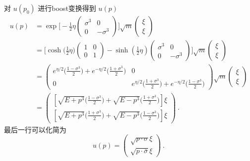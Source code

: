 \begin{exercise}{对 $u(p_0)$ 进行boost变换得到 $u(p)$}
\begin{equation}
\begin{aligned}\nonumber
u(p) & = \exp \bigg[ - \frac{1}{2} \eta \begin{pmatrix}
\sigma^3 & 0 \\ 
0 & - \sigma^3
\end{pmatrix} \bigg] \sqrt{m} \begin{pmatrix}
\xi \\ \xi
\end{pmatrix} \\ \nonumber
& = \bigg[ \cosh\big(\frac{1}{2}\eta\big)\begin{pmatrix}
1 & 0 \\
0 & 1
\end{pmatrix} - \sinh (\frac{1}{2}\eta) \begin{pmatrix}
\sigma^3 & 0 \\ \nonumber
0 & - \sigma^3
\end{pmatrix} \bigg]\sqrt{m} \begin{pmatrix}
\xi \\ \xi
\end{pmatrix} \\ \nonumber
& = \begin{pmatrix}
e^{\eta/2}\bigg(\frac{1-\sigma^3}{2}\bigg)+e^{-\eta/2}\bigg(\frac{1+\sigma^3}{2}\bigg) & 0\\
0 & e^{\eta/2}\bigg(\frac{1+\sigma^3}{2}\bigg)+e^{-\eta/2}\bigg(\frac{1-\sigma^3}{2}\bigg)
\end{pmatrix}\sqrt{m}\begin{pmatrix}
\xi \\ 
\xi
\end{pmatrix} \\\nonumber
& = \begin{pmatrix}
[\sqrt{E+p^3}\bigg(\frac{1-\sigma^3}{2}\bigg)+\sqrt{E-p^3}\bigg(\frac{1+\sigma^3}{2}\bigg)]\xi \\
[\sqrt{E+p^3}\bigg(\frac{1+\sigma^3}{2}\bigg)+\sqrt{E-p^3}\bigg(\frac{1-\sigma^3}{2}\bigg)]\xi
\end{pmatrix}~.
\end{aligned}
\end{equation}
最后一行可以化简为
\begin{equation}
u(p) = \begin{pmatrix}
\sqrt{p\cdot\sigma}\xi \\
\sqrt{p\cdot\bar\sigma}\xi
\end{pmatrix}~.
\end{equation}
\end{exercise}

